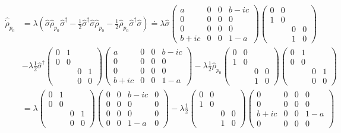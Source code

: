 \documentclass[11pt]{article}
\numberwithin{equation}{section} %
\numberwithin{figure}{section} %
\begin{document}
\begin{appendices}
\begin{equation} \label{lindblad_calc}
\begin{split}
\hat{\dot{\rho}}_{p_0}
&=\lambda\left(\hat{\sigma}\hat{\rho}_{p_0}\hat{\sigma}^\dagger - \frac{1}{2}\hat{\sigma}^\dagger \hat{\sigma}\hat{\rho}_{p_0}-\frac{1}{2}\hat{\rho}_{p_0}\hat{\sigma}^\dagger\hat{\sigma}\right)\doteq \lambda\hat{\sigma}\begin{pmatrix}a&0&0&b-ic\\0&0&0&0\\0&0&0&0\\b+ic&0&0&1-a\end{pmatrix}\begin{pmatrix}0&0&&\\1&0&&\\&&0&0\\&&1&0\end{pmatrix}\\
&-\lambda\frac{1}{2}\hat{\sigma}^\dagger\begin{pmatrix}0&1&&\\0&0&&\\&&0&1\\&&0&0\end{pmatrix}\begin{pmatrix}a&0&0&b-ic\\0&0&0&0\\0&0&0&0\\b+ic&0&0&1-a\end{pmatrix}-\lambda\frac{1}{2}\hat{\rho}_{p_0}\begin{pmatrix}0&0&&\\1&0&&\\&&0&0\\&&1&0\end{pmatrix}\begin{pmatrix}0&1&&\\0&0&&\\&&0&1\\&&0&0\end{pmatrix}\\
&=\lambda\begin{pmatrix}0&1&&\\0&0&&\\&&0&1\\&&0&0\end{pmatrix}\begin{pmatrix}0&0&b-ic&0\\0&0&0&0\\0&0&0&0\\0&0&1-a&0\end{pmatrix}-\lambda\frac{1}{2}\begin{pmatrix}0&0&&\\1&0&&\\&&0&0\\&&1&0\end{pmatrix}\begin{pmatrix}0&0&0&0\\0&0&0&0\\b+ic&0&0&1-a\\0&0&0&0\end{pmatrix}\\

\end{split}
\end{equation}
\end{appendices}
\end{document}
